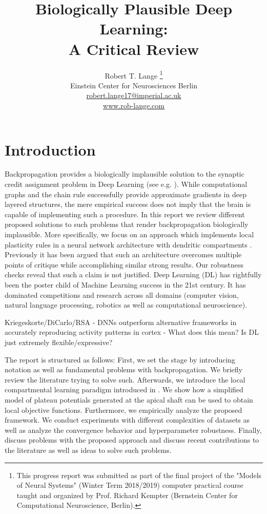 \documentclass[colorinlistoftodos]{article}
\title{Biologically Plausible Deep Learning: \\
		A Critical Review}
\author{
  Robert T. Lange \thanks{This progress report was submitted as part of the final project of the "Models of Neural Systems" (Winter Term 2018/2019) computer practical course taught and organized by Prof. Richard Kempter (Bernstein Center for Computational Neuroscience, Berlin).} \\
  Einstein Center for Neurosciences Berlin\\
  \url{robert.lange17@imperial.ac.uk} \\
  \url{www.rob-lange.com} \\
}
\theoremstyle{definition}
\newcommand{\rob}[1]{\todo[color=red!40]{Rob: #1}}
\begin{document}
\maketitle



\section{Introduction}

Backpropagation \citep{rumelhart1986} provides a biologically implausible solution to the synaptic credit assignment problem in Deep Learning (see e.g. \citet{lecun2015, schmidhuber2015}). While computational graphs and the chain rule successfully provide approximate gradients in deep layered structures, the mere empirical success does not imply that the brain is capable of implementing such a procedure.\rob{Restructure Introduction!}
In this report we review different proposed solutions to such problems that render backpropagation biologically implausible. More specifically, we focus on an approach which implements local plasticity rules in a neural network architecture with dendritic compartments \citep{guerguiev2017}.
Previously it has been argued that such an architecture overcomes multiple points of critique while accomplishing similar strong results. Our robustness checks reveal that such a claim is not justified.
Deep Learning (DL) has rightfully been the poster child of Machine Learning success in the 21st century. It has dominated competitions and research across all domains (computer vision, natural language processing, robotics as well as computational neuroscience).

Kriegeskorte/DiCarlo/RSA - DNNs outperform alternative frameworks in accurately reproducing activity patterns in cortex - What does this mean? Is DL just extremely flexible/expressive?

The report is structured as follows: First, we set the stage by introducing notation as well as fundamental problems with backpropagation. 
We briefly review the literature trying to solve such.
Afterwards, we introduce the local compartmental learning paradigm introduced in \citet{guerguiev2017}. We show how a simplified model of plateau potentials generated at the apical shaft can be used to obtain local objective functions.
Furthermore, we empirically analyze the proposed framework. We conduct experiments with different complexities of datasets as well as analyze the convergence behavior and hyperparameter robustness.
Finally, discuss problems with the proposed approach and discuss recent contributions to the literature as well as ideas to solve such problems.
\end{document}
